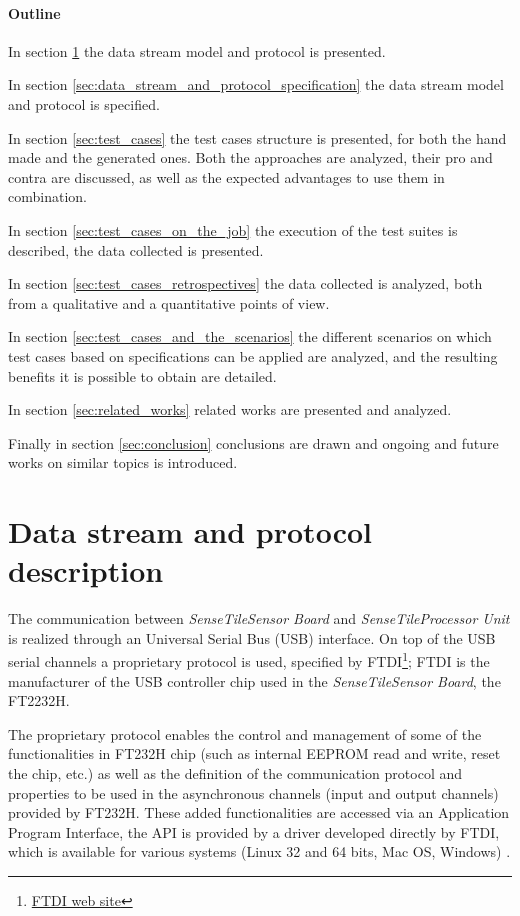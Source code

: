 \documentclass{article} \usepackage{times}
\newcommand{\myhref}[2]{\ifpdf\href{#1}{#2}\else\htmladdnormallinkfoot{#2}{#1}\fi}
\newcommand{\ST}{\emph{SenseTile}\xspace}
\newcommand{\SB}{\emph{Sensor Board}\xspace}
\newcommand{\STSB}{\ST \SB\xspace}
\newcommand{\STPU}{\ST \emph{Processor Unit}\xspace}
\begin{document}
\paragraph*{Outline}

In section \ref{sec:data_stream_and_protocol_description} the data stream model 
and protocol is presented.

In section \ref{sec:data_stream_and_protocol_specification} the data stream model 
and protocol is specified.

In section \ref{sec:test_cases} the test cases structure is presented, for 
both the hand made and the generated ones. 
Both the approaches are analyzed, their pro and contra are discussed, as 
well as the expected advantages to use them in combination.

In section \ref{sec:test_cases_on_the_job} the execution of the test suites
is described, the data collected is presented.

In section \ref{sec:test_cases_retrospectives} the data collected is analyzed, 
both from a qualitative and a quantitative points of view.

In section \ref{sec:test_cases_and_the_scenarios} the different scenarios on 
which test cases based on specifications can be applied are analyzed, and 
the resulting benefits it is possible to obtain are detailed.

In section \ref{sec:related_works} related works are presented and analyzed.

Finally in section \ref{sec:conclusion} conclusions are drawn and 
ongoing and future works on similar topics is introduced.



\section{Data stream and protocol description}
\label{sec:data_stream_and_protocol_description}

The communication between \STSB and \STPU is realized through an Universal 
Serial Bus (USB) interface.
On top of the USB serial channels a proprietary protocol is used, specified by 
FTDI\footnote{\myhref{http://www.ftdichip.com/}{FTDI web site}}; FTDI is the 
manufacturer of the USB controller chip used in the \STSB, the 
FT2232H\cite{ftdi_ft232h_2009}.

The proprietary protocol enables the control and management of some of the 
functionalities in FT232H chip (such as internal EEPROM read and write, reset 
the chip, etc.) as well as the definition of the communication protocol and 
properties to be used in the asynchronous channels (input and output channels) 
provided by FT232H.
These added functionalities are accessed via an Application Program Interface,
the API is provided by a driver developed directly by FTDI, which is available 
for various systems (Linux 32 and 64 bits, Mac OS, Windows)
\cite{ftdi_d2xx_api_2009}.
\end{document}
